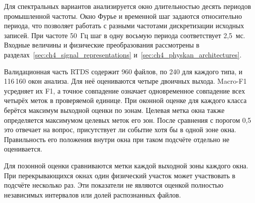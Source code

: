 Для спектральных вариантов анализируется окно
длительностью десять периодов промышленной частоты.
Окно Фурье и временной шаг задаются относительно периода,
что позволяет работать с разными частотами дискретизации
исходных записей. При частоте 50~Гц шаг в одну восьмую
периода соответствует 2,5~мс.
Входные величины и физические преобразования
рассмотрены в разделах~\ref{sec:ch4_signal_representations}
и~\ref{sec:ch4_physkan_architectures}.

Валидационная часть RTDS содержит 960 файлов,
по 240 для каждого типа, и 116\,160 окон анализа.
Для неё оцениваются четыре двоичных выхода.
Macro-F1 усредняет их F1, а точное совпадение
означает одновременное совпадение всех четырёх меток
в проверяемой единице. При оконной оценке для каждого
класса берётся максимум выходной оценки по зонам.
Целевая метка окна также определяется максимумом
целевых меток его зон. После сравнения с порогом
0,5 это отвечает на вопрос, присутствует ли событие
хотя бы в одной зоне окна. Правильность его положения
внутри окна при таком подсчёте отдельно не оценивается.

Для позонной оценки сравниваются метки каждой выходной
зоны каждого окна. При перекрывающихся окнах один
физический участок может участвовать в подсчёте
несколько раз. Эти показатели не являются оценкой
полностью независимых интервалов или долей
распознанных файлов.

